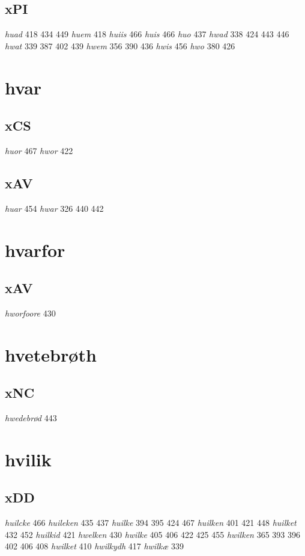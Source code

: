 \documentclass[a4paper,twocolumn]{article}
\begin{document}
\subsection{xPI}
\label{sec:org69a9eeb}
\emph{huad} 418 434 449 \emph{huem} 418 \emph{huiis} 466 \emph{huis} 466 \emph{huo} 437 \emph{hwad} 338 424 443 446 \emph{hwat} 339 387 402 439 \emph{hwem} 356 390 436 \emph{hwis} 456 \emph{hwo} 380 426 
\section{hvar}
\label{sec:orgd4a7ff4}
\subsection{xCS}
\label{sec:orge643a5e}
\emph{huor} 467 \emph{hwor} 422 
\subsection{xAV}
\label{sec:orgdec9b64}
\emph{huar} 454 \emph{hwar} 326 440 442 
\section{hvarfor}
\label{sec:org7835011}
\subsection{xAV}
\label{sec:orgcc2f7ad}
\emph{hworfoore} 430 
\section{hvetebrøth}
\label{sec:org2694018}
\subsection{xNC}
\label{sec:org761691a}
\emph{hwedebrød} 443 
\section{hvilik}
\label{sec:orgb190a4c}
\subsection{xDD}
\label{sec:orge9f9863}
\emph{huilcke} 466 \emph{huileken} 435 437 \emph{huilke} 394 395 424 467 \emph{huilken} 401 421 448 \emph{huilket} 432 452 \emph{huilkid} 421 \emph{hwelken} 430 \emph{hwilke} 405 406 422 425 455 \emph{hwilken} 365 393 396 402 406 408 \emph{hwilket} 410 \emph{hwilkydh} 417 \emph{hwilkæ} 339 
\end{document}
